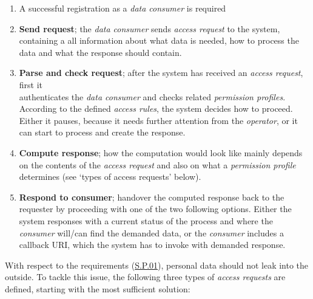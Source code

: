 \documentclass[12pt,english,a4paper,titlepage,cleardoublepage=empty,dottedtoc]{report}
\begin{document}
\begin{enumerate}
\def\labelenumi{\arabic{enumi})}
\setcounter{enumi}{-1}
\item
  A successful registration as a \emph{data consumer} is required
\item
  \textbf{Send request}; the \emph{data consumer} sends \emph{access
  request} to the system, containing a all information about what data
  is needed, how to process the data and what the response should
  contain.
\item
  \textbf{Parse and check request}; after the system has received an
  \emph{access request}, first it\\
  authenticates the \emph{data consumer} and checks related
  \emph{permission profiles}. According to the defined \emph{access
  rules}, the system decides how to proceed. Either it pauses, because
  it needs further attention from the \emph{operator}, or it can start
  to process and create the response.
\item
  \textbf{Compute response}; how the computation would look like mainly
  depends on the contents of the \emph{access request} and also on what
  a \emph{permission profile} determines (see `types of access requests'
  below).
\item
  \textbf{Respond to consumer}; handover the computed response back to
  the requester by proceeding with one of the two following options.
  Either the system responses with a current status of the process and
  where the \emph{consumer} will/can find the demanded data, or the
  \emph{consumer} includes a callback URI, which the system has to
  invoke with demanded response.
\end{enumerate}

With respect to the requirements (\protect\hyperlink{sp01}{S.P.01}),
personal data should not leak into the outside. To tackle this issue,
the following three types of \emph{access requests} are defined,
starting with the most sufficient solution:
\end{document}
